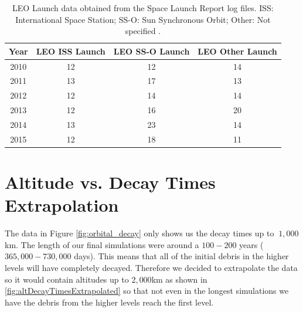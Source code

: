 \documentclass[pre,12pt]{revtex4-1}
\begin{document}
\begin{table}[htb]
\centering
    \begin{tabular}{| c | c | c | c |} \hline
    \textbf{Year} & \textbf{LEO ISS Launch} & \textbf{LEO SS-O Launch}  & \textbf{LEO Other Launch} \\ \hline
    2010 & 12 & 12 & 14\\ \hline
    2011 & 13 & 17 & 13\\ \hline
    2012 & 12 & 14 & 14\\ \hline
    2013 & 12 & 16 & 20\\ \hline
    2014 & 13 & 23 & 14\\ \hline
    2015 & 12 & 18 & 11\\ \hline
    \end{tabular}
\caption{LEO Launch data obtained from the Space Launch Report log files. ISS: International Space Station; SS-O: Sun Synchronous Orbit; Other: Not specified \cite{spaceLaunchReport}.}
\end{table}

\clearpage
\section{Altitude vs. Decay Times Extrapolation}\label{AppendixB}
The data in Figure \ref{fig:orbital_decay} only shows us the decay times up to $~1,000$km. The length of our final simulations were around a $100-200$ years ($365,000-730,000$ days). This means that all of the initial debris in the higher levels will have completely decayed. Therefore we decided to extrapolate the data so it would contain altitudes up to $2,000$km as shown in \ref{fig:altDecayTimesExtrapolated} so that not even in the longest simulations we have the debris from the higher levels reach the first level.
\end{document}
